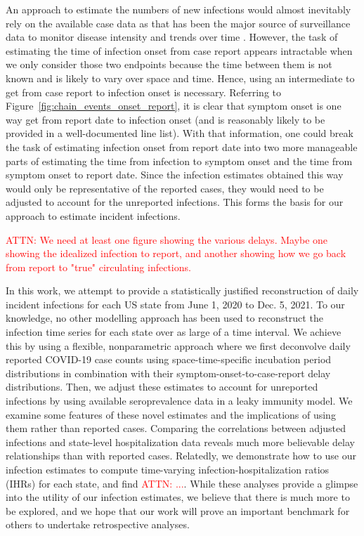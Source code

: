 \documentclass{article}
\newcommand{\attn}[1]{\textcolor{red}{ATTN: #1}}
\begin{document}
An approach to estimate the numbers of new infections would almost inevitably rely on the available case data as that has been the major source of surveillance data to monitor disease intensity and trends over time \citep{ecdc2020strategies}. However, the task of estimating the time of infection onset from case report appears intractable when we only consider those two endpoints because the time between them is not known and is likely to vary over space and time. Hence, using an intermediate to get from case report to infection onset is necessary. Referring to Figure~\ref{fig:chain_events_onset_report}, it is clear that symptom onset is one way get from report date to infection onset (and is reasonably likely to be provided in a well-documented line list). With that information, one could break the task of estimating infection onset from report date into two more manageable parts of estimating the time from infection to symptom onset and the time from symptom onset to report date. Since the infection estimates obtained this way would only be representative of the reported cases, they would need to be adjusted to account for the unreported infections. This forms the basis for our approach to estimate incident infections.



\attn{We need at least one figure showing the various delays. Maybe one showing the idealized infection to report, and another showing how we go back from report to "true" circulating infections.}

In this work, we attempt to provide a statistically justified reconstruction of daily incident infections for each US state from June 1, 2020 to Dec. 5, 2021. To our knowledge, no other modelling approach has been used to reconstruct the infection time series for each state over as large of a time interval. We achieve this by using a flexible, nonparametric approach where we first deconvolve daily reported COVID-19 case counts using space-time-specific incubation period distributions in combination with their symptom-onset-to-case-report delay distributions. Then, we adjust these estimates to account for unreported infections by using available seroprevalence data in a leaky immunity model. We examine some features of these novel estimates and the implications of using them rather than reported cases. Comparing the correlations between adjusted infections and state-level hospitalization data reveals much more believable delay relationships than with reported cases. Relatedly, we demonstrate how to use our infection estimates to compute time-varying infection-hospitalization ratios (IHRs) for each state, and find \attn{...}. While these analyses provide a glimpse into the utility of our infection estimates, we believe that there is much more to be explored, and we hope that our work will prove an important benchmark for others to undertake retrospective analyses.
\end{document}
